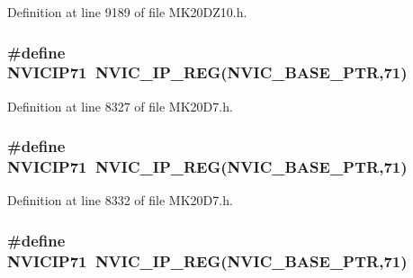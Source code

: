 Definition at line 9189 of file M\+K20\+D\+Z10.\+h.

\subsubsection[{\texorpdfstring{N\+V\+I\+C\+I\+P71}{NVICIP71}}]{\setlength{\rightskip}{0pt plus 5cm}\#define N\+V\+I\+C\+I\+P71~{\bf N\+V\+I\+C\+\_\+\+I\+P\+\_\+\+R\+EG}({\bf N\+V\+I\+C\+\_\+\+B\+A\+S\+E\+\_\+\+P\+TR},71)}\hypertarget{group___n_v_i_c___register___accessor___macros_ga4ba1b85df63145ee339bda7c40cf2f3a}{}\label{group___n_v_i_c___register___accessor___macros_ga4ba1b85df63145ee339bda7c40cf2f3a}


Definition at line 8327 of file M\+K20\+D7.\+h.

\subsubsection[{\texorpdfstring{N\+V\+I\+C\+I\+P71}{NVICIP71}}]{\setlength{\rightskip}{0pt plus 5cm}\#define N\+V\+I\+C\+I\+P71~{\bf N\+V\+I\+C\+\_\+\+I\+P\+\_\+\+R\+EG}({\bf N\+V\+I\+C\+\_\+\+B\+A\+S\+E\+\_\+\+P\+TR},71)}\hypertarget{group___n_v_i_c___register___accessor___macros_ga4ba1b85df63145ee339bda7c40cf2f3a}{}\label{group___n_v_i_c___register___accessor___macros_ga4ba1b85df63145ee339bda7c40cf2f3a}


Definition at line 8332 of file M\+K20\+D7.\+h.

\subsubsection[{\texorpdfstring{N\+V\+I\+C\+I\+P71}{NVICIP71}}]{\setlength{\rightskip}{0pt plus 5cm}\#define N\+V\+I\+C\+I\+P71~{\bf N\+V\+I\+C\+\_\+\+I\+P\+\_\+\+R\+EG}({\bf N\+V\+I\+C\+\_\+\+B\+A\+S\+E\+\_\+\+P\+TR},71)}\hypertarget{group___n_v_i_c___register___accessor___macros_ga4ba1b85df63145ee339bda7c40cf2f3a}{}\label{group___n_v_i_c___register___accessor___macros_ga4ba1b85df63145ee339bda7c40cf2f3a}


